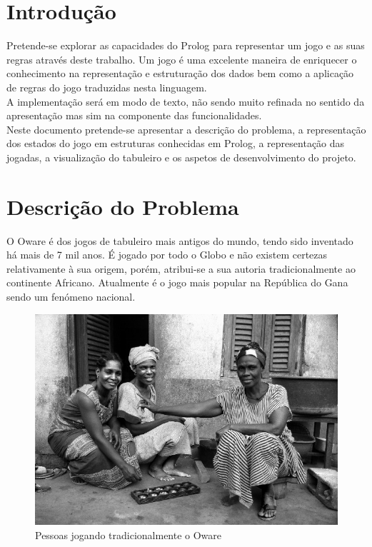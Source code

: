 \documentclass[15pt,a4paper]{article}
\begin{document}


\section{Introdução}
Pretende-se explorar as capacidades do Prolog para representar um jogo e as suas regras através deste trabalho. Um jogo é uma excelente maneira de enriquecer o conhecimento na representação e estruturação dos dados bem como a aplicação de regras do jogo traduzidas nesta linguagem. \\
\indent A implementação será em modo de texto, não sendo muito refinada no sentido da apresentação mas sim na componente das funcionalidades. \\
\indent Neste documento pretende-se apresentar a descrição do problema, a representação dos estados do jogo em estruturas conhecidas em Prolog, a representação das jogadas, a visualização do tabuleiro e os aspetos de desenvolvimento do projeto.

\section{Descrição do Problema}
O Oware é dos jogos de tabuleiro mais antigos do mundo, tendo sido inventado há mais de 7 mil anos. É jogado por todo o Globo e não existem certezas relativamente à sua origem, porém, atribui-se a sua autoria tradicionalmente ao continente Africano. Atualmente é o jogo mais popular na República do Gana sendo um fenómeno nacional.

\begin{figure}[h!]
\begin{center}
\includegraphics[scale=20]{awale.jpg}
\caption{Pessoas jogando tradicionalmente o Oware}
\label{fig:traditional}
\end{center}
\end{figure}
\end{document}
